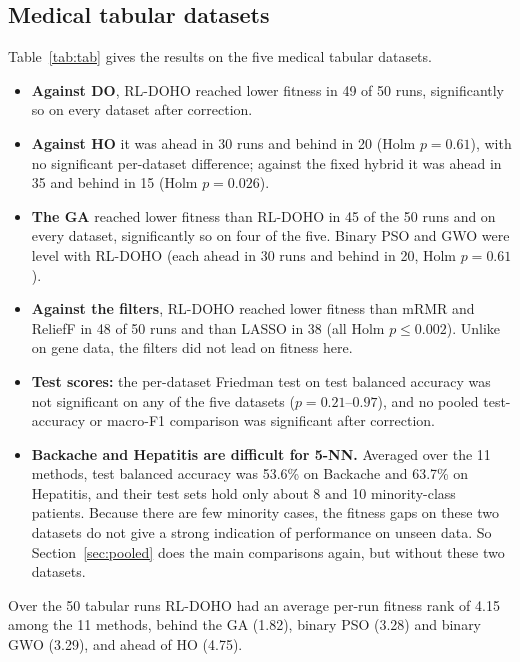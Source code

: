 \documentclass[pdflatex,sn-basic]{sn-jnl}
\begin{document}
\subsection{Medical tabular datasets}
Table~\ref{tab:tab} gives the results on the five medical tabular datasets.
\begin{itemize}
\item \textbf{Against DO}, RL-DOHO reached lower fitness in 49 of 50 runs, significantly so on every dataset after correction.
\item \textbf{Against HO} it was ahead in 30 runs and behind in 20 (Holm $p=0.61$), with no significant per-dataset difference; against the fixed hybrid it was ahead in 35 and behind in 15 (Holm $p=0.026$).
\item \textbf{The GA} reached lower fitness than RL-DOHO in 45 of the 50 runs and on every dataset, significantly so on four of the five. Binary PSO and GWO were level with RL-DOHO (each ahead in 30 runs and behind in 20, Holm $p=0.61$).
\item \textbf{Against the filters}, RL-DOHO reached lower fitness than mRMR and ReliefF in 48 of 50 runs and than LASSO in 38 (all Holm $p\le0.002$). Unlike on gene data, the filters did not lead on fitness here.
\item \textbf{Test scores:} the per-dataset Friedman test on test balanced accuracy was not significant on any of the five datasets ($p=0.21$--$0.97$), and no pooled test-accuracy or macro-F1 comparison was significant after correction.
\item \textbf{Backache and Hepatitis are difficult for 5-NN.} Averaged over the 11 methods, test balanced accuracy was 53.6\% on Backache and 63.7\% on Hepatitis, and their test sets hold only about 8 and 10 minority-class patients. Because there are few minority cases, the fitness gaps on these two datasets do not give a strong indication of performance on unseen data. So Section~\ref{sec:pooled} does the main comparisons again, but without these two datasets.
\end{itemize}
Over the 50 tabular runs RL-DOHO had an average per-run fitness rank of 4.15 among the 11 methods, behind the GA (1.82), binary PSO (3.28) and binary GWO (3.29), and ahead of HO (4.75).
\end{document}

